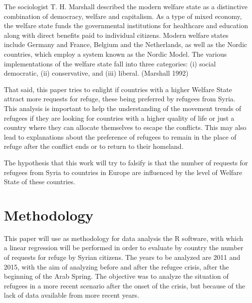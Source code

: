 \documentclass[]{elsarticle} %
\begin{document}
The sociologist T. H. Marshall described the modern welfare state as a
distinctive combination of democracy, welfare and capitalism. As a type
of mixed economy, the welfare state funds the governmental institutions
for healthcare and education along with direct benefits paid to
individual citizens. Modern welfare states include Germany and France,
Belgium and the Netherlands, as well as the Nordic countries, which
employ a system known as the Nordic Model. The various implementations
of the welfare state fall into three categories: (i) social democratic,
(ii) conservative, and (iii) liberal. (Marshall 1992)

That said, this paper tries to enlight if countries with a higher
Welfare State attract more requests for refuge, these being preferred by
refugees from Syria. This analysis is important to help the
understanding of the movement trends of refugees if they are looking for
countries with a higher quality of life or just a country where they can
allocate themselves to escape the conflicts. This may also lead to
explanations about the preference of refugees to remain in the place of
refuge after the conflict ends or to return to their homeland.

The hypothesis that this work will try to falsify is that the number of
requests for refugees from Syria to countries in Europe are influenced
by the level of Welfare State of these countries.

\section{Methodology}\label{methodology}

This paper will use as methodology for data analysis the R software,
with which a linear regression will be performed in order to evaluate by
country the number of requests for refuge by Syrian citizens. The years
to be analyzed are 2011 and 2015, with the aim of analyzing before and
after the refugee crisis, after the beginning of the Arab Spring. The
objective was to analyze the situation of refugees in a more recent
scenario after the onset of the crisis, but because of the lack of data
available from more recent years.
\end{document}
